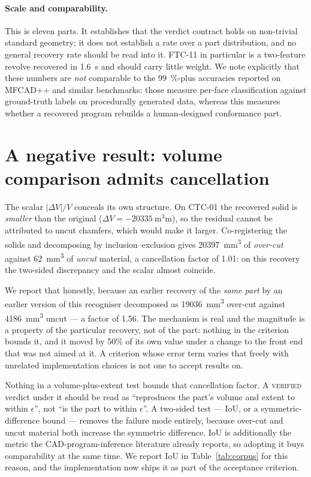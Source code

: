 \documentclass[11pt]{article}
\newcommand{\VERIFIED}{\textsc{verified}}
\begin{document}
\paragraph{Scale and comparability.} This is eleven parts. It establishes that
the verdict contract holds on non-trivial standard geometry; it does not
establish a rate over a part distribution, and no general recovery rate should
be read into it. FTC-11 in particular is a two-feature revolve recovered in
\SI{1.6}{\second} and should carry little weight. We note explicitly that these
numbers are \emph{not} comparable to the \SI{99}{\percent}-plus accuracies
reported on MFCAD++ and similar benchmarks: those measure per-face
classification against ground-truth labels on procedurally generated data,
whereas this measures whether a recovered program rebuilds a human-designed
conformance part.

\section{A negative result: volume comparison admits cancellation}
\label{sec:cancellation}

The scalar $|\Delta V|/V$ conceals its own structure. On CTC-01 the recovered
solid is \emph{smaller} than the original ($\Delta V =
\SI{-20335}{\cubic\milli\metre}$), so the residual cannot be attributed to uncut
chamfers, which would make it larger. Co-registering the solids and decomposing
by inclusion--exclusion gives \SI{20397}{\cubic\milli\metre} of \emph{over-cut}
against \SI{62}{\cubic\milli\metre} of \emph{uncut} material, a cancellation
factor of \num{1.01}: on this recovery the two-sided discrepancy and the scalar
almost coincide.

We report that honestly, because an earlier recovery of the \emph{same part} by
an earlier version of this recogniser decomposed as
\SI{19036}{\cubic\milli\metre} over-cut against \SI{4186}{\cubic\milli\metre}
uncut --- a factor of \num{1.56}. The mechanism is real and the magnitude is a
property of the particular recovery, not of the part: nothing in the criterion
bounds it, and it moved by \num{50}\% of its own value under a change to the
front end that was not aimed at it. A criterion whose error term varies that
freely with unrelated implementation choices is not one to accept results on.

Nothing in a volume-plus-extent test bounds that cancellation factor. A
\VERIFIED{} verdict under it should be read as ``reproduces the part's volume
and extent to within $\epsilon$'', not ``is the part to within $\epsilon$''. A
two-sided test --- IoU, or a symmetric-difference bound --- removes the failure
mode entirely, because over-cut and uncut material both increase the symmetric
difference. IoU is additionally the metric the CAD-program-inference literature
already reports, so adopting it buys comparability at the same time. We report
IoU in Table~\ref{tab:corpus} for this reason, and the implementation now ships
it as part of the acceptance criterion.
\end{document}
